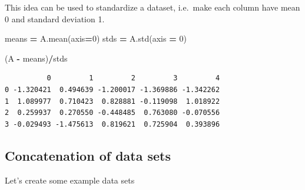 \documentclass[
  letterpaper,
]{scrbook}
\newenvironment{Shaded}{\begin{snugshade}}{\end{snugshade}}
\newcommand{\DecValTok}[1]{\textcolor[rgb]{0.00,0.00,0.81}{#1}}
\newcommand{\NormalTok}[1]{#1}
\newcommand{\OperatorTok}[1]{\textcolor[rgb]{0.81,0.36,0.00}{\textbf{#1}}}
\begin{document}
This idea can be used to standardize a dataset, i.e.~make each column have mean 0 and standard deviation 1.

\begin{Shaded}
\begin{Highlighting}[]
\NormalTok{means }\OperatorTok{=}\NormalTok{ A.mean(axis}\OperatorTok{=}\DecValTok{0}\NormalTok{)}
\NormalTok{stds }\OperatorTok{=}\NormalTok{ A.std(axis }\OperatorTok{=} \DecValTok{0}\NormalTok{)}

\NormalTok{(A }\OperatorTok{-}\NormalTok{ means)}\OperatorTok{/}\NormalTok{stds}
\end{Highlighting}
\end{Shaded}

\begin{verbatim}
          0         1         2         3         4
0 -1.320421  0.494639 -1.200017 -1.369886 -1.342262
1  1.089977  0.710423  0.828881 -0.119098  1.018922
2  0.259937  0.270550 -0.448485  0.763080 -0.070556
3 -0.029493 -1.475613  0.819621  0.725904  0.393896
\end{verbatim}

\hypertarget{concatenation-of-data-sets}{%
\subsection{Concatenation of data sets}\label{concatenation-of-data-sets}}

Let's create some example data sets
\end{document}
